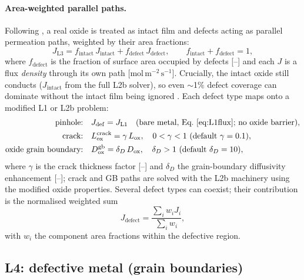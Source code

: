 \documentclass[11pt,a4paper]{article}
\newcommand{\Dox}{D_{\mathrm{ox}}}
\newcommand{\Lox}{L_{\mathrm{ox}}}
\begin{document}
\paragraph{Area-weighted parallel paths.} Following
\citet{strehlow1974}, a real oxide is treated as intact film and defects
acting as parallel permeation paths, weighted by their area fractions:
\begin{equation}
  J_{\mathrm{L3}} = f_{\mathrm{intact}}\, J_{\mathrm{intact}}
                  + f_{\mathrm{defect}}\, J_{\mathrm{defect}},
  \qquad f_{\mathrm{intact}} + f_{\mathrm{defect}} = 1,
  \label{eq:L3parallel}
\end{equation}
where $f_{\mathrm{defect}}$ is the fraction of surface area occupied by
defects [--] and each $J$ is a flux \emph{density} through its own path
[$\mathrm{mol\,m^{-2}\,s^{-1}}$]. Crucially, the intact oxide still conducts
($J_{\mathrm{intact}}$ from the full L2b solver), so even $\sim$1\% defect
coverage can dominate without the intact film being ignored
\citep{zarchy1979}. Each defect type maps onto a modified L1 or L2b problem:
\begin{align}
  \text{pinhole:}&\quad J_{\mathrm{def}} = J_{\mathrm{L1}}
    \quad\text{(bare metal, Eq.~\eqref{eq:L1flux}; no oxide barrier)},
    \nonumber\\
  \text{crack:}&\quad \Lox^{\mathrm{crack}} = \gamma\,\Lox,
    \quad 0<\gamma<1 \text{ (default } \gamma=0.1\text{)},
    \label{eq:crack}\\
  \text{oxide grain boundary:}&\quad \Dox^{\mathrm{gb}} = \delta_D\,\Dox,
    \quad \delta_D>1 \text{ (default } \delta_D=10\text{)},
    \label{eq:gbdefect}
\end{align}
where $\gamma$ is the crack thickness factor [--] and $\delta_D$ the
grain-boundary diffusivity enhancement [--]; crack and GB paths are solved
with the L2b machinery using the modified oxide properties. Several defect
types can coexist; their contribution is the normalised weighted sum
\begin{equation}
  J_{\mathrm{defect}} = \frac{\sum_i w_i J_i}{\sum_i w_i},
  \label{eq:mixed}
\end{equation}
with $w_i$ the component area fractions within the defective region.

\subsection{L4: defective metal (grain boundaries)}
\end{document}
